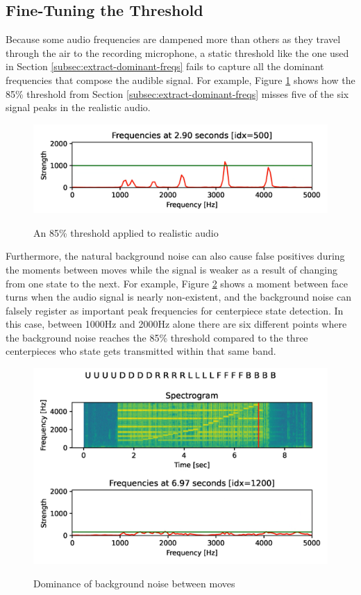 \subsection{Fine-Tuning the Threshold}
\label{subsec:fine-tuning-threshold}

Because some audio frequencies are dampened more than others as they
travel through the air to the recording microphone, a static threshold
like the one used in Section \ref{subsec:extract-dominant-freqs} fails
to capture all the dominant frequencies that compose the audible
signal. For example, Figure \ref{fig:threshold-miss} shows how the 85\%
threshold from Section \ref{subsec:extract-dominant-freqs} misses five
of the six signal peaks in the realistic audio.

\begin{figure}[h]
    \centering
    \caption{An 85\% threshold applied to realistic audio}
    \includegraphics[width=0.8\linewidth]{Figures/5 Algorithm Design/threshold-miss.png}
    \label{fig:threshold-miss}
\end{figure}

Furthermore, the natural background noise can also cause false
positives during the moments between moves while the signal is weaker
as a result of changing from one state to the next. For example, Figure
\ref{fig:threshold-false-positives} shows a moment between face turns
when the audio signal is nearly non-existent, and the background noise
can falsely register as important peak frequencies for centerpiece
state detection. In this case, between 1000Hz and 2000Hz alone there
are six different points where the background noise reaches the 85\%
threshold compared to the three centerpieces who state gets transmitted
within that same band.

\begin{figure}[h]
    \centering
    \caption{Dominance of background noise between moves}
    \includegraphics[width=0.8\linewidth]{Figures/5 Algorithm Design/threshold-false-positives.png}
    \label{fig:threshold-false-positives}
\end{figure}


